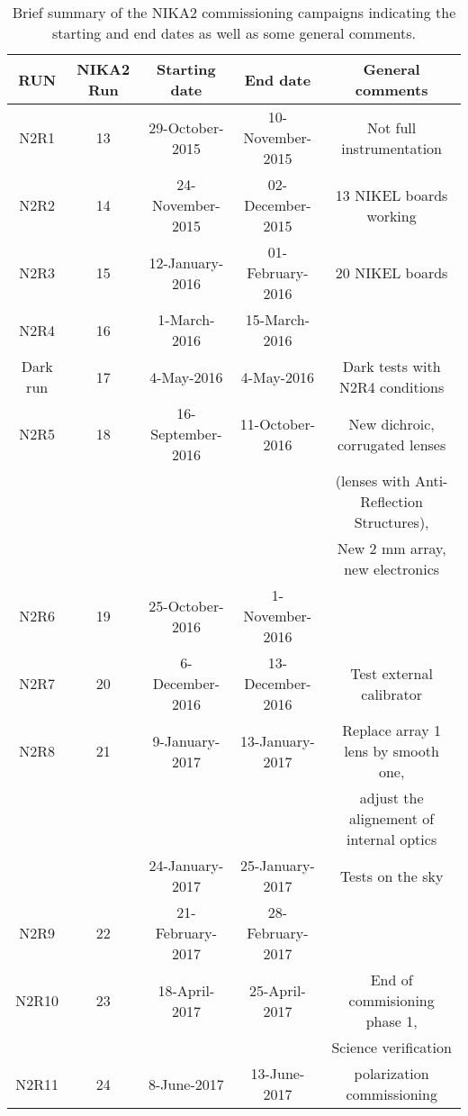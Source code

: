 \begin{table}[h]
\small
\begin{center} 
\begin{tabular}{|c|c|c|c|c|}
\hline 
RUN  & NIKA2 Run & Starting date    & End date         &  General comments \\
\hline
N2R1     & 13       & 29-October-2015   & 10-November-2015 & Not full instrumentation        \\
N2R2     & 14       & 24-November-2015  & 02-December-2015 & 13 NIKEL boards working         \\
N2R3     & 15       & 12-January-2016   & 01-February-2016 & 20 NIKEL boards                 \\
N2R4     & 16       & 1-March-2016      & 15-March-2016    & 	                               \\
Dark run & 17       & 4-May-2016        & 4-May-2016       & Dark tests with N2R4 conditions  \\
\hline
N2R5     & 18       & 16-September-2016 & 11-October-2016  & New dichroic, corrugated lenses \\
         &          &                   &                  & (lenses with Anti-Reflection Structures), \\
         &          &                   &                  &  New 2 mm array, new electronics \\
N2R6     & 19       & 25-October-2016   & 1-November-2016  &                                  \\
N2R7     & 20       & 6-December-2016   & 13-December-2016 & Test external calibrator         \\
N2R8     & 21       & 9-January-2017    & 13-January-2017  & Replace array 1 lens by smooth one, \\
         &          &                   &                  &  adjust the alignement of internal optics \\ 
         &          & 24-January-2017   & 25-January-2017  & Tests on the sky   \\
N2R9     & 22       & 21-February-2017  & 28-February-2017 &                                   \\
N2R10    & 23       & 18-April-2017     & 25-April-2017    & End of commisioning phase 1,     \\
         &          &                   &                  & Science verification  \\  
N2R11    & 24       &  8-June-2017      & 13-June-2017     &  polarization commissioning  \\
\hline
\end{tabular}
\caption[Commissioning campaigns, dates and general comments.]{
Brief summary of the NIKA2 commissioning campaigns indicating the starting and end dates as well as
some general comments.
\label{nika2runs}}
\end{center} 
\end{table} 

